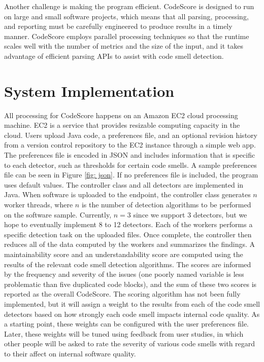 \documentclass{sig-alternate}
\begin{document}
Another challenge is making the program efficient. CodeScore is designed to run
on large and small software projects, which means that all parsing, processing,
and reporting must be carefully engineered to produce results in a timely
manner. CodeScore employs parallel processing techniques so that the runtime
scales well with the number of metrics and the size of the input, and it takes
advantage of efficient parsing APIs to assist with code smell detection.


\section{System Implementation}
\label{subsec:approach}

All processing for CodeScore happens on an Amazon EC2 cloud processing machine.
EC2 is a service that provides resizable computing capacity in the cloud. 
Users upload Java code, a preferences file, and an optional revision
history from a version control repository to the EC2 instance through a simple web app. The preferences 
file is encoded in JSON and includes information that is specific to each detector, 
such as thresholds for certain code smells. A sample preferences file can be
seen in Figure \ref{fig: json}. If no preferences
file is included, the program uses default values. The controller class and all
detectors are implemented in Java. 
When software is uploaded to the endpoint, the controller class
generates $n$ worker threads, where $n$ is the number of detection algorithms to be
performed on the software sample. Currently, $n=3$ since we support $3$
detectors, but we hope to eventually implement 8 to 12 detectors. 
Each of the workers performs a specific detection task on the uploaded files.
Once complete, the controller then reduces all of the data computed by the workers and
summarizes the findings. A maintainability score and an understandability score
are computed using the results of the relevant code smell detection
algorithms. The scores are informed by the frequency and severity of the
issues (one poorly named variable is less problematic than five duplicated code
blocks), and the sum of these two scores is reported as the overall
CodeScore. The scoring algorithm has not been fully implemented, but it will
assign a weight to the results from each of the code smell detectors based on how
strongly each code smell impacts internal code quality. As a starting point,
these weights can be configured with the user preferences file. Later, these
weights will be tuned using feedback from user studies, in which other people
will be asked to rate the severity of various code smells with regard to their
affect on internal software quality.
\end{document}
